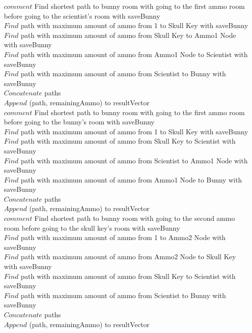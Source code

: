 \documentclass[10pt]{article}
\begin{document}
		$comment$  Find shortest path to bunny room with going to the first ammo room before going to the scientist's room with saveBunny \\
		 $Find$ path with maximum amount of ammo from 1 to Skull Key with saveBunny  \\
		 $Find$ path with maximum amount of ammo from Skull Key to Ammo1 Node with saveBunny \\
		 $Find$ path with maximum amount of ammo from Ammo1 Node to Scientist with saveBunny \\
		 $Find$ path with maximum amount of ammo from Scientist to Bunny with saveBunny \\
		$Concatenate$ paths  \\
		$Append$ (path, remainingAmmo) to resultVector \\

		$comment$  Find shortest path to bunny room with going to the first ammo room before going to the bunny's room with saveBunny \\
		 $Find$ path with maximum amount of ammo from 1 to Skull Key with saveBunny  \\
		 $Find$ path with maximum amount of ammo from Skull Key to Scientist with saveBunny \\
		 $Find$ path with maximum amount of ammo from Scientist to Ammo1 Node with saveBunny \\
		 $Find$ path with maximum amount of ammo from Ammo1 Node to Bunny with saveBunny \\
		$Concatenate$ paths  \\
		$Append$ (path, remainingAmmo) to resultVector \\

		$comment$  Find shortest path to bunny room with going to the second ammo room before going to the skull key's room with saveBunny \\
		 $Find$ path with maximum amount of ammo from 1 to Ammo2 Node with saveBunny  \\
		 $Find$ path with maximum amount of ammo from Ammo2 Node to Skull Key with saveBunny  \\
		 $Find$ path with maximum amount of ammo from Skull Key to Scientist with saveBunny \\
		 $Find$ path with maximum amount of ammo from Scientist to Bunny with saveBunny \\
		$Concatenate$ paths  \\
		$Append$ (path, remainingAmmo) to resultVector \\
\end{document}
